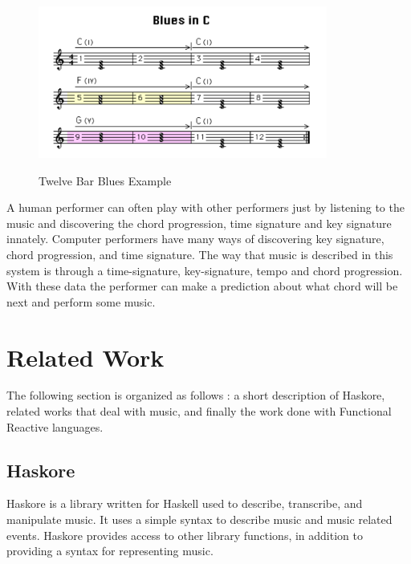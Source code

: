 \documentclass[12pt]{ucthesis}
\newcommand{\captionfonts}{\small\bf\ssp}
\begin{document}
\begin{figure}
\includegraphics[height=50mm]{blues-example.pdf}
\captionfonts
\caption[Twelve Bar Blues Example]{Twelve Bar Blues Example}
\label{fig:blues-example}
\end{figure}

A human performer can often play with other performers just by listening to the music and discovering the chord progression, time signature and key signature innately. Computer performers have many ways of discovering key signature, chord progression, and time signature. The way that music is described in this system is through a time-signature, key-signature, tempo and chord progression. With these data the performer can make a prediction about what chord will be next and perform some music.


\chapter{Related Work}
\label{rw}

The following section is organized as follows : a short description of Haskore, related works that deal with music, and finally the work done with Functional Reactive languages.

\section{Haskore}
\label{rw:haskore}

Haskore is a library written for Haskell used to describe, transcribe, and manipulate music. It uses a simple syntax to describe music and music related events. Haskore provides access to other library functions, in addition to providing a syntax for representing music. 
\end{document}
